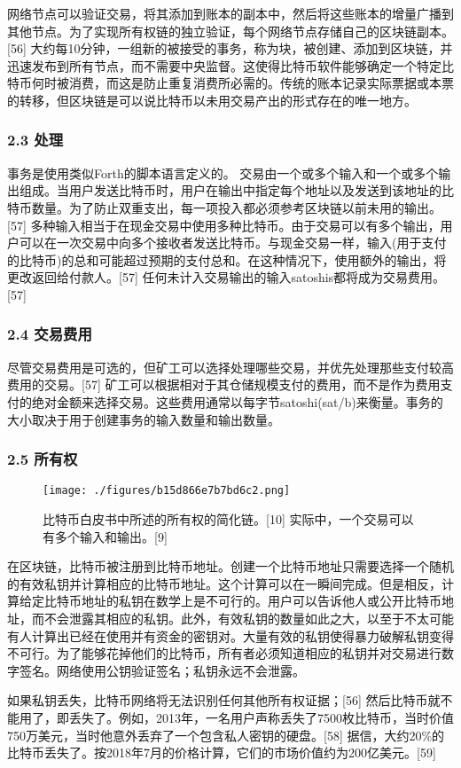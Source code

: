 网络节点可以验证交易，将其添加到账本的副本中，然后将这些账本的增量广播到其他节点。为了实现所有权链的独立验证，每个网络节点存储自己的区块链副本。[56] 大约每10分钟，一组新的被接受的事务，称为块，被创建、添加到区块链，并迅速发布到所有节点，而不需要中央监督。这使得比特币软件能够确定一个特定比特币何时被消费，而这是防止重复消费所必需的。传统的账本记录实际票据或本票的转移，但区块链是可以说比特币以未用交易产出的形式存在的唯一地方。
\subsubsection{2.3 处理}
事务是使用类似Forth的脚本语言定义的。 交易由一个或多个输入和一个或多个输出组成。当用户发送比特币时，用户在输出中指定每个地址以及发送到该地址的比特币数量。为了防止双重支出，每一项投入都必须参考区块链以前未用的输出。[57] 多种输入相当于在现金交易中使用多种比特币。由于交易可以有多个输出，用户可以在一次交易中向多个接收者发送比特币。与现金交易一样，输入(用于支付的比特币)的总和可能超过预期的支付总和。在这种情况下，使用额外的输出，将更改返回给付款人。[57] 任何未计入交易输出的输入satoshis都将成为交易费用。[57]\subsubsection{2.4 交易费用}
尽管交易费用是可选的，但矿工可以选择处理哪些交易，并优先处理那些支付较高费用的交易。[57] 矿工可以根据相对于其仓储规模支付的费用，而不是作为费用支付的绝对金额来选择交易。这些费用通常以每字节satoshi(sat/b)来衡量。事务的大小取决于用于创建事务的输入数量和输出数量。
\subsubsection{2.5 所有权}
\begin{figure}[ht]
\centering
\texttt{[image: ./figures/b15d866e7b7bd6c2.png]}
\caption{比特币白皮书中所述的所有权的简化链。[10] 实际中，一个交易可以有多个输入和输出。[9]} \label{fig_BTC_2}
\end{figure}
在区块链，比特币被注册到比特币地址。创建一个比特币地址只需要选择一个随机的有效私钥并计算相应的比特币地址。这个计算可以在一瞬间完成。但是相反，计算给定比特币地址的私钥在数学上是不可行的。用户可以告诉他人或公开比特币地址，而不会泄露其相应的私钥。此外，有效私钥的数量如此之大，以至于不太可能有人计算出已经在使用并有资金的密钥对。大量有效的私钥使得暴力破解私钥变得不可行。为了能够花掉他们的比特币，所有者必须知道相应的私钥并对交易进行数字签名。网络使用公钥验证签名；私钥永远不会泄露。

如果私钥丢失，比特币网络将无法识别任何其他所有权证据；[56] 然后比特币就不能用了，即丢失了。例如，2013年，一名用户声称丢失了7500枚比特币，当时价值750万美元，当时他意外丢弃了一个包含私人密钥的硬盘。[58] 据信，大约20\%的比特币丢失了。按2018年7月的价格计算，它们的市场价值约为200亿美元。[59]

